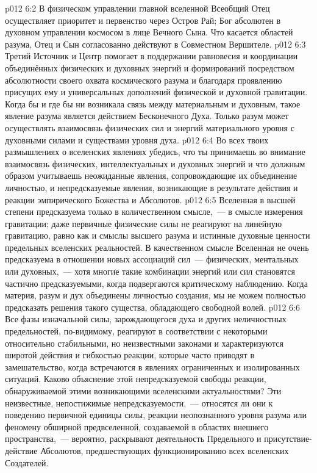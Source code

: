 \vs p012 6:2 В физическом управлении главной вселенной Всеобщий Отец осуществляет приоритет и первенство через Остров Рай; Бог абсолютен в духовном управлении космосом в лице Вечного Сына. Что касается областей разума, Отец и Сын согласованно действуют в Совместном Вершителе.
\vs p012 6:3 Третий Источник и Центр помогает в поддержании равновесия и координации объединённых физических и духовных энергий и формирований посредством абсолютности своего охвата космического разума и благодаря проявлению присущих ему и универсальных дополнений физической и духовной гравитации. Когда бы и где бы ни возникала связь между материальным и духовным, такое явление разума является действием Бесконечного Духа. Только разум может осуществлять взаимосвязь физических сил и энергий материального уровня с духовными силами и существами уровня духа.
\vs p012 6:4 Во всех твоих размышлениях о вселенских явлениях убедись, что ты принимаешь во внимание взаимосвязь физических, интеллектуальных и духовных энергий и что должным образом учитываешь неожиданные явления, сопровождающие их объединение личностью, и непредсказуемые явления, возникающие в результате действия и реакции эмпирического Божества и Абсолютов.
\vs p012 6:5 Вселенная в высшей степени предсказуема только в количественном смысле,~--- в смысле измерения гравитации; даже первичные физические силы не реагируют на линейную гравитацию, равно как и смыслы высшего разума и истинные духовные ценности предельных вселенских реальностей. В качественном смысле Вселенная не очень предсказуема в отношении новых ассоциаций сил~--- физических, ментальных или духовных,~--- хотя многие такие комбинации энергий или сил становятся частично предсказуемыми, когда подвергаются критическому наблюдению. Когда материя, разум и дух объединены личностью создания, мы не можем полностью предсказать решения такого существа, обладающего свободной волей.
\vs p012 6:6 \pc Все фазы изначальной силы, зарождающегося духа и других неличностных предельностей, по\hyp{}видимому, реагируют в соответствии с некоторыми относительно стабильными, но неизвестными законами и характеризуются широтой действия и гибкостью реакции, которые часто приводят в замешательство, когда встречаются в явлениях ограниченных и изолированных ситуаций. Каково объяснение этой непредсказуемой свободы реакции, обнаруживаемой этими возникающими вселенскими актуальностями? Эти неизвестные, непостижимые непредсказуемости,~--- относятся ли они к поведению первичной единицы силы, реакции неопознанного уровня разума или феномену обширной предвселенной, создаваемой в областях внешнего пространства,~--- вероятно, раскрывают деятельность Предельного и присутствие\hyp{}действие Абсолютов, предшествующих функционированию всех вселенских Создателей.

